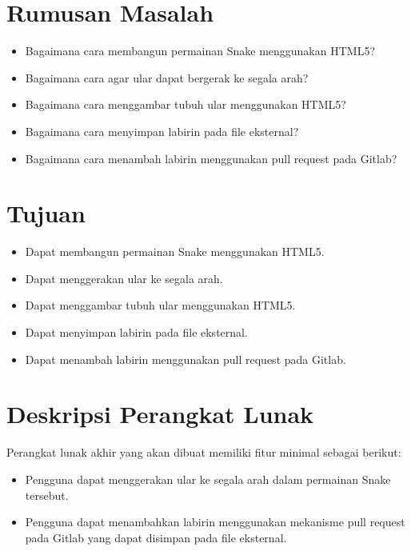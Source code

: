 \documentclass[a4paper,twoside]{article}
\begin{document}
\section{Rumusan Masalah}
\begin{itemize}
	\item Bagaimana cara membangun permainan Snake menggunakan HTML5? 
	\item Bagaimana cara agar ular dapat bergerak ke segala arah?
	\item Bagaimana cara menggambar tubuh ular menggunakan HTML5?
	\item Bagaimana cara menyimpan labirin pada file eksternal?
	\item Bagaimana cara menambah labirin menggunakan pull request pada Gitlab?
\end{itemize}

\section{Tujuan}
\begin{itemize}
	\item Dapat membangun permainan Snake menggunakan HTML5. 
	\item Dapat menggerakan ular ke segala arah.
	\item Dapat menggambar tubuh ular menggunakan HTML5.
	\item Dapat menyimpan labirin pada ﬁle eksternal.
	\item Dapat menambah labirin menggunakan pull request pada Gitlab.
\end{itemize}

\section{Deskripsi Perangkat Lunak}
Perangkat lunak akhir yang akan dibuat memiliki fitur minimal sebagai berikut:
\begin{itemize}
	\item Pengguna dapat menggerakan ular ke segala arah dalam permainan Snake tersebut. 
	\item Pengguna dapat menambahkan labirin menggunakan mekanisme pull request pada Gitlab yang dapat disimpan pada file eksternal.
\end{itemize}
\end{document}

